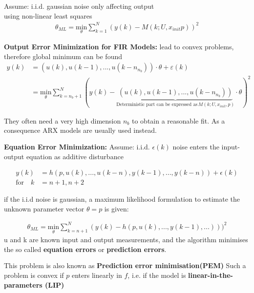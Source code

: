 \begin{tcolorbox}[colback=purple!5!white,colframe=purple!75!black,title=\textbf{Pure Output Error (OE) Minimization}]
	Assume: i.i.d. gaussian noise only affecting output\\
	using non-linear least squares
	\begin{align*}
	\theta_{ML} =\underset{\theta}{\text{min}} \sum_{k=1}^{N} (y(k)-M(k;U, x_{init} p))^2
	\end{align*}
	
	\textbf{Output Error Minimization for FIR Models:}
	lead to convex problems, therefore global minimum can be found
	\begin{align*}
	y(k) &= (u(k), u(k-1), ..., u(k-n_{n_b})) \cdot \theta +\varepsilon(k) &\\
	&= \underset {\theta}{ \text{min} } \sum_{k=n_{b}+1}^{N} (y(k)-\underbrace{(u(k), u(k-1),... , u(k-n_{n_b}))}_{\text{Deterministic part can be expressed as}\, M(k; U, x_{init}, p)} \cdot \theta)^2 &
	\end{align*}
	
	They often need a very high dimension $n_b$ to obtain a reasonable fit. As a consequence ARX models are usually used instead.
	
	\textbf{Equation Error Minimization:}
	Assume: i.i.d. $\epsilon(k)$ noise enters the input-output equation as additive disturbance
	
	\begin{align*}
	y(k) &= h(p, u(k), ..., u(k-n), y(k-1), ..., y(k-n)) + \epsilon(k)\\
	\text{for} \quad k &= n + 1, n + 2
	\end{align*}
	
	if the i.i.d noise is gaussian, a maximum likelihood formulation to estimate the unknown parameter vector $\theta = p$ is given:
	
	\begin{align*}
	\theta_{ML} = \underset {\theta}{ \text{min} } \sum_{k = n + 1}^{N}{(y(k) - h(p, u(k), ..., y(k-1), ...)) )^2}
	\end{align*}
	u and k are known input and output measurements, and the algorithm minimises the so called \textbf{equation errors} or \textbf{prediction errors}.
	
	This problem is also known as \textbf{Prediction error minimisation(PEM)}
	Such a problem is convex if $p$ enters linearly in $f$, i.e. if the model is \textbf{linear-in-the-parameters (LIP)}
	
	
	

\end{tcolorbox}
